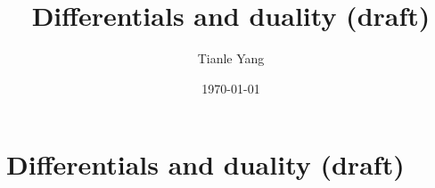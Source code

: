 \documentclass{noteformyself}
\title{Differentials and duality (draft)}
\author{Tianle Yang}
\date{\today}
\begin{document}
    \maketitle

    \section{Differentials and duality (draft)}


\end{document}
